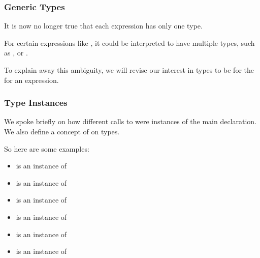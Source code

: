 \documentclass[aspectratio=169, handout]{beamer}
\begin{document}
\begin{frame}[fragile]
  \frametitle{Generic Types}

  It is now no longer true that each expression has only one type. 

  \pause
  \vspace{\fill}

  For certain expressions like , it could be 
  interpreted to have multiple types, such as , or .

  \pause
  \vspace{\fill}

  To explain away this ambiguity, we will revise our interest in types to be 
  for the  for an expression.

  \pause
  \vspace{\fill}

\end{frame}

\begin{frame}[fragile]
  \frametitle{Type Instances}

  We spoke briefly on how different calls to  were instances of
  the main declaration. We also define a concept of  on types. 
  
  \pause
  \vspace{\fill}


  \pause
  \vspace{\fill}

  So here are some examples:
  \begin{itemize}
    \item {} is an instance of  
    \item {} is an instance of  
    \item {} is an instance of  
    \item {} is an instance of  
    \item {} is an instance of 
    \item {} is an instance of 
  \end{itemize}
\end{frame}
\end{document}
